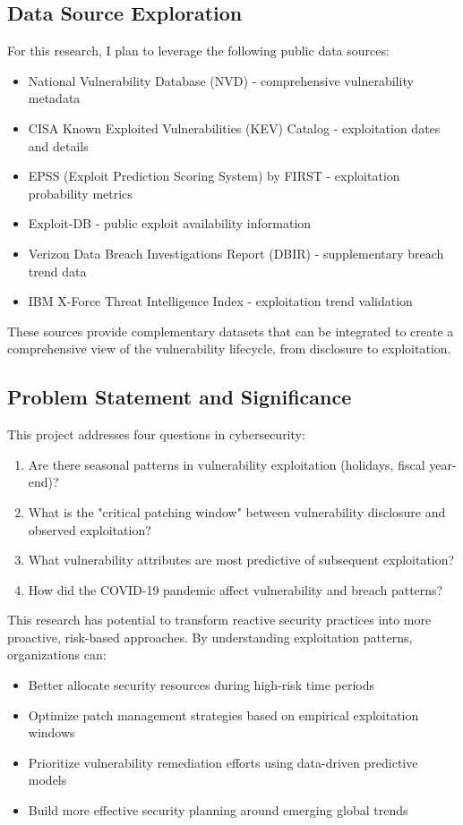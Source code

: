 \documentclass[runningheads]{llncs}
\begin{document}
\subsection{Data Source Exploration}
For this research, I plan to leverage the following public data sources:
\begin{itemize}
    \item National Vulnerability Database (NVD) -  comprehensive vulnerability metadata
    \item CISA Known Exploited Vulnerabilities (KEV) Catalog -  exploitation dates and details
    \item EPSS (Exploit Prediction Scoring System) by FIRST -  exploitation probability metrics
    \item Exploit-DB -  public exploit availability information
    \item Verizon Data Breach Investigations Report (DBIR) -  supplementary breach trend data
    \item IBM X-Force Threat Intelligence Index -  exploitation trend validation
\end{itemize}

These sources provide complementary datasets that can be integrated to create a comprehensive view of the vulnerability lifecycle, from disclosure to exploitation.

\subsection{Problem Statement and Significance}
This project addresses four questions in cybersecurity:
\begin{enumerate}
    \item Are there seasonal patterns in vulnerability exploitation (holidays, fiscal year-end)?
    \item What is the "critical patching window" between vulnerability disclosure and observed exploitation?
    \item What vulnerability attributes are most predictive of subsequent exploitation?
    \item How did the COVID-19 pandemic affect vulnerability and breach patterns?
\end{enumerate}

This research has potential to transform reactive security practices into more proactive, risk-based approaches. By understanding exploitation patterns, organizations can:
\begin{itemize}
    \item Better allocate security resources during high-risk time periods
    \item Optimize patch management strategies based on empirical exploitation windows
    \item Prioritize vulnerability remediation efforts using data-driven predictive models
    \item Build more effective security planning around emerging global trends
\end{itemize}
\end{document}

